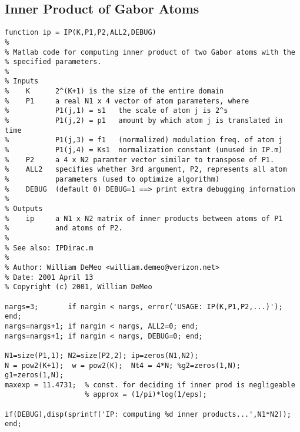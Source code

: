 \subsection{Inner Product of Gabor Atoms}\label{sec:IP}
\begin{small}\begin{verbatim}
function ip = IP(K,P1,P2,ALL2,DEBUG)
%
% Matlab code for computing inner product of two Gabor atoms with the
% specified parameters.
%
% Inputs
%    K      2^(K+1) is the size of the entire domain
%    P1     a real N1 x 4 vector of atom parameters, where
%           P1(j,1) = s1   the scale of atom j is 2^s
%           P1(j,2) = p1   amount by which atom j is translated in time
%           P1(j,3) = f1   (normalized) modulation freq. of atom j
%           P1(j,4) = Ks1  normalization constant (unused in IP.m)
%    P2     a 4 x N2 paramter vector similar to transpose of P1.
%    ALL2   specifies whether 3rd argument, P2, represents all atom
%           parameters (used to optimize algorithm)
%    DEBUG  (default 0) DEBUG=1 ==> print extra debugging information
%
% Outputs
%    ip     a N1 x N2 matrix of inner products between atoms of P1
%           and atoms of P2. 
%
% See also: IPDirac.m
%
% Author: William DeMeo <william.demeo@verizon.net>
% Date: 2001 April 13
% Copyright (c) 2001, William DeMeo

nargs=3;       if nargin < nargs, error('USAGE: IP(K,P1,P2,...)'); end; 
nargs=nargs+1; if nargin < nargs, ALL2=0; end; 
nargs=nargs+1; if nargin < nargs, DEBUG=0; end;

N1=size(P1,1); N2=size(P2,2); ip=zeros(N1,N2);
N = pow2(K+1);  w = pow2(K);  Nt4 = 4*N; %g2=zeros(1,N); g1=zeros(1,N);
maxexp = 11.4731;  % const. for deciding if inner prod is negligeable
                   % approx = (1/pi)*log(1/eps); 

if(DEBUG),disp(sprintf('IP: computing %d inner products...',N1*N2)); end;


\end{verbatim}
\end{small}
